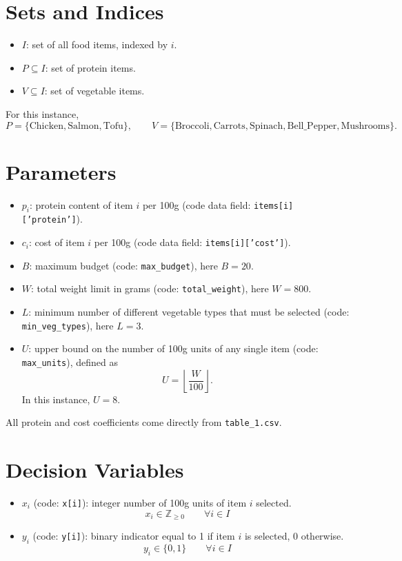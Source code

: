 \section*{Sets and Indices}

\begin{itemize}
    \item $I$: set of all food items, indexed by $i$.
    \item $P \subseteq I$: set of protein items.
    \item $V \subseteq I$: set of vegetable items.
\end{itemize}

For this instance,
\[
P=\{\text{Chicken},\text{Salmon},\text{Tofu}\}, \qquad
V=\{\text{Broccoli},\text{Carrots},\text{Spinach},\text{Bell\_Pepper},\text{Mushrooms}\}.
\]

\section*{Parameters}

\begin{itemize}
    \item $p_i$: protein content of item $i$ per 100g (code data field: \texttt{items[i]['protein']}).
    \item $c_i$: cost of item $i$ per 100g (code data field: \texttt{items[i]['cost']}).
    \item $B$: maximum budget (code: \texttt{max\_budget}), here $B=20$.
    \item $W$: total weight limit in grams (code: \texttt{total\_weight}), here $W=800$.
    \item $L$: minimum number of different vegetable types that must be selected (code: \texttt{min\_veg\_types}), here $L=3$.
    \item $U$: upper bound on the number of 100g units of any single item (code: \texttt{max\_units}), defined as
    \[
    U=\left\lfloor \frac{W}{100} \right\rfloor.
    \]
    In this instance, $U=8$.
\end{itemize}

All protein and cost coefficients come directly from \texttt{table\_1.csv}.

\section*{Decision Variables}

\begin{itemize}
    \item $x_i$ (code: \texttt{x[i]}): integer number of 100g units of item $i$ selected.
    \[
    x_i \in \mathbb{Z}_{\ge 0} \qquad \forall i \in I
    \]
    \item $y_i$ (code: \texttt{y[i]}): binary indicator equal to 1 if item $i$ is selected, 0 otherwise.
    \[
    y_i \in \{0,1\} \qquad \forall i \in I
    \]
\end{itemize}

